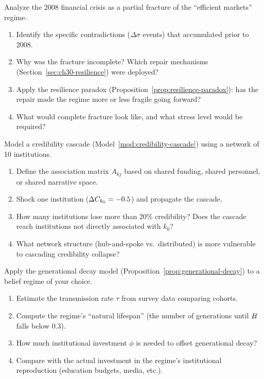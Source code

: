 \begin{exercise}
Analyze the 2008 financial crisis as a partial fracture of the ``efficient markets'' regime.
\begin{enumerate}[nosep]
  \item Identify the specific contradictions ($\Delta\sigma$ events) that accumulated prior to 2008.
  \item Why was the fracture incomplete? Which repair mechanisms (Section~\ref{sec:ch30-resilience}) were deployed?
  \item Apply the resilience paradox (Proposition~\ref{prop:resilience-paradox}): has the repair made the regime more or less fragile going forward?
  \item What would complete fracture look like, and what stress level would be required?
\end{enumerate}
\end{exercise}

\begin{exercise}
Model a credibility cascade (Model~\ref{mod:credibility-cascade}) using a network of 10 institutions.
\begin{enumerate}[nosep]
  \item Define the association matrix $A_{kj}$ based on shared funding, shared personnel, or shared narrative space.
  \item Shock one institution ($\Delta C_{k_0} = -0.5$) and propagate the cascade.
  \item How many institutions lose more than 20\% credibility? Does the cascade reach institutions not directly associated with $k_0$?
  \item What network structure (hub-and-spoke vs.\ distributed) is more vulnerable to cascading credibility collapse?
\end{enumerate}
\end{exercise}

\begin{exercise}
Apply the generational decay model (Proposition~\ref{prop:generational-decay}) to a belief regime of your choice.
\begin{enumerate}[nosep]
  \item Estimate the transmission rate $\tau$ from survey data comparing cohorts.
  \item Compute the regime's ``natural lifespan'' (the number of generations until $B_{}$ falls below 0.3).
  \item How much institutional investment $\phi$ is needed to offset generational decay?
  \item Compare with the actual investment in the regime's institutional reproduction (education budgets, media, etc.).
\end{enumerate}
\end{exercise}

